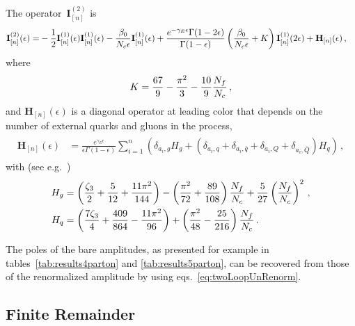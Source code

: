 The operator~$\mathbf{I}^{(2)}_{[n]}$ is
\begin{align}
  \label{eqn:Iop}
  \begin{split} 
    \mathbf{I}^{(2)}_{[n]}(\epsilon)=&
    -\frac{1}{2}\mathbf{I}^{(1)}_{[n]}(\epsilon)\mathbf{I}^{(1)}_{[n]}(\epsilon)
    -\frac{\beta_0}{{N_c}\epsilon}\mathbf{I}^{(1)}_{[n]}(\epsilon) + 
    \frac{e^{-\gamma_E\epsilon}\Gamma(1-2\epsilon)}
    {\Gamma(1-\epsilon)}
    \left(\frac{\beta_0}{{N_c}\epsilon}+K\right)
    \mathbf{I}^{(1)}_{[n]}(2\epsilon) + 
    \mathbf{H}_{[n]}(\epsilon)\,,
  \end{split}
\end{align}
where 
\begin{equation}
K=\frac{67}{9}-\frac{\pi ^2}{3}-\frac{10}{9}\frac{{N_f}}{{N_c}}\,,
\end{equation}
and $\mathbf{H}_{[n]}(\epsilon)$ is a diagonal operator at 
leading color that depends on the number of external quarks 
and gluons in the process,
\begin{align}
  \begin{split}
    \mathbf{H}_{[n]}(\epsilon)&=
    \frac{e^{\gamma_E\epsilon}}{\epsilon\Gamma(1-\epsilon)}
    \sum_{i=1}^n\left(
    \delta_{a_i,g}H_g+
    (\delta_{a_i,q}+\delta_{a_i,\bar q}
    +\delta_{a_i,Q}+\delta_{a_i,\bar Q})
    H_q
    \right)\,,
  \end{split}
\end{align}
with (see e.g.~\cite{Bern:2003ck})
\begin{align}
  \begin{split}
    H_g&= \left(\frac{\zeta_3}{2}+\frac{5}{12}+
    \frac{11\pi^2}{144}\right)
    -\left(\frac{\pi^2}{72}+\frac{89}{108}\right)\frac{N_f}{{N_c}}
    +\frac{5}{27}\left(\frac{N_f}{{N_c}}\right)^2\,,\\
    H_q&=
    \left(\frac{7\zeta_3}{4}+\frac{409}{864}
    -\frac{11\pi^2}{96}\right)
    +\left(\frac{\pi^2}{48}-\frac{25}{216}\right)\frac{N_f}{{N_c}}\,.
  \end{split}
\end{align}

The poles of the bare amplitudes, as presented for example in
tables~\ref{tab:results4parton} and \ref{tab:results5parton}, can be recovered
from those of the renormalized amplitude by using
eqs.~\eqref{eq:twoLoopUnRenorm}.

\subsection{Finite Remainder}\label{sec:remainders}

